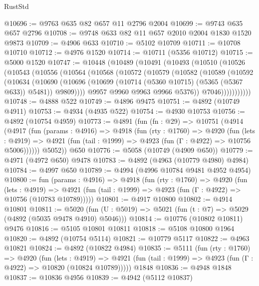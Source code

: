 \begin{lexlean}{RustStd}
\begin{coremodule}
@10696 := @9763 @635 @82 @657 @11 @2796 @2004
@10699 := @9743 @635 @657 @2796
@10708 := @9748 @633 @82 @11 @657 @2010 @2004 @1830 @1520 @9873
@10709 := @4906 @633
@10710 := @5102 @10709
@10711 := @10708 @10710
@10712 := @4976 @1520
@10714 := @10711 (@5356 @10712)
@10715 := @5000 @1520
@10747 := @10448
    (@10489
      (@10491
        (@10493
          (@10510
            (@10526
              (@10543
                (@10556
                  (@10564
                    (@10568
                      (@10572
                        (@10579
                          (@10582
                            (@10589
                              (@10592
                                (@10634
                                  (@10690
                                    (@10696
                                      (@10699 (@10714 (@5360 @10715) (@5365 (@5367 @633)) @5481))
                                      @9809))))
                              @9957
                              @9960
                              @9963
                              @9966
                              @5376))
                          @7046)))))))))))
@10748 := @4888 @522
@10749 := @4896 @9475
@10751 := @4892 (@10749 @4911)
@10753 := @4934 (@4935 @522)
@10754 := @4930 @10753
@10756 := @4892 (@10754 @4959)
@10773 := @4891
    (fun (fn : @29) =>
    @10751
      (@4914
        (@4917
          (fun (params : @4916) =>
          @4918
            (fun (rty : @1760) =>
            @4920
              (fun (lets : @4919) =>
              @4921 (fun (tail : @1999) => @4923 (fun (Γ : @4922) => @10756 @5006))))))
        @5052))
    @650
@10776 := @5058 (@10749 (@4909 @650))
@10779 := @4971 (@4972 @650) @9478
@10783 := @4892 (@4963 (@10779 @4980) @4984)
@10784 := @4997 @650
@10789 := @4994 (@4996 @10784 @9481 @4952 @4954)
@10800 := fun (params : @4916) =>
  @4918
    (fun (rty : @1760) =>
    @4920
      (fun (lets : @4919) =>
      @4921 (fun (tail : @1999) => @4923 (fun (Γ : @4922) => @10756 (@10783 @10789)))))
@10801 := @4917 @10800
@10802 := @4914 @10801
@10811 := @5020 (fun (U : @5019) => @5021 (fun (t : @7) => @5029 (@4892 (@5035 @9478 @4910) @5046)))
@10814 := @10776 (@10802 @10811) @9476
@10816 := @5105 @10801 @10811
@10818 := @5108 @10800 @1964
@10820 := @4892 (@10754 @5114)
@10821 := @10779 @5117
@10822 := @4963 @10821
@10824 := @4892 (@10822 @4984)
@10835 := @5111
    (fun (rty : @1760) =>
    @4920
      (fun (lets : @4919) =>
      @4921 (fun (tail : @1999) => @4923 (fun (Γ : @4922) => @10820 (@10824 @10789)))))
    @1848
@10836 := @4948 @1848
@10837 := @10836 @4956
@10839 := @4942 (@5112 @10837)

\end{coremodule}
\end{lexlean}
